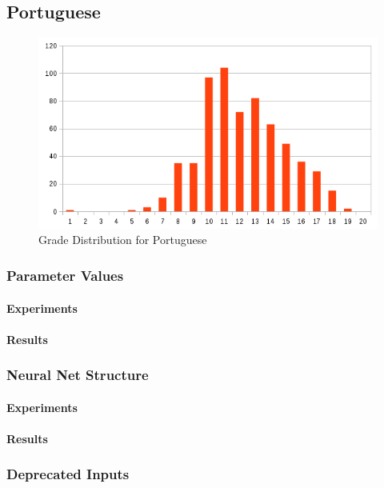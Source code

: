 \documentclass[11pt]{article}
\begin{document}
\subsection{Portuguese}
\begin{figure}[H]
\label{fig:Grade Distribution for Portuguese}
\includegraphics[scale=0.6]{por-chart.png}
\centering
\caption{Grade Distribution for Portuguese}
\end{figure}
\subsubsection{Parameter Values}

\paragraph{Experiments}
\paragraph{Results}
\subsubsection{Neural Net Structure}
\paragraph{Experiments}
\paragraph{Results}
\subsubsection{Deprecated Inputs}
\end{document}
